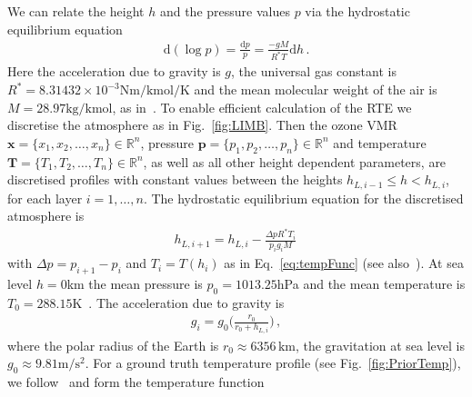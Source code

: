 We can relate the height $h$ and the pressure values $p$ via the hydrostatic equilibrium equation
\begin{align}
	\text{d}(\log p) = \frac{\text{d}p}{p} = \frac{- g M}{R^* T} \text{d} h \, .\label{eq:hydr}
\end{align}
Here the acceleration due to gravity is $g$, the universal gas constant is $R^* = 8.31432 \times 10^{-3} \text{Nm} / \text{kmol} / \text{K}$ and the mean molecular weight of the air is $M = 28.97 \text{kg/kmol}$, as in~\cite{atmosphere1976us}.
To enable efficient calculation of the RTE we discretise the atmosphere as in Fig.~\ref{fig:LIMB}.
Then the ozone VMR $\bm{x} =\{x_1,x_2,\ldots,x_n\} \in \mathbb{R}^{n}$, pressure $\bm{p} =\{p_1,p_2,\ldots,p_n\} \in \mathbb{R}^{n}$ and temperature $\bm{T} =\{T_1,T_2,\ldots,T_n\} \in \mathbb{R}^{n}$, as well as all other height dependent parameters, are discretised profiles with constant values between the heights $h_{L,i-1} \leq h < h_{L,i}$, for each layer $i = 1,\dots, n$.
The hydrostatic equilibrium equation for the discretised atmosphere is
\begin{align}
	h_{L,i+1} =  h_{L,i} - \frac{\Delta p R^* T_i  }{p_i  g_i M} \, 
\end{align}
with $\Delta p = p_{i+1} - p_{i}$ and $T_i = T(h_i)$ as in Eq.~\ref{eq:tempFunc} (see also~\cite{Carlotti99,Ridolfi00}).
At sea level $h = 0$km the mean pressure is $p_0 = 1013.25$hPa and the mean temperature is $T_0 = 288.15$K~\cite{atmosphere1976us}.
The acceleration due to gravity is
\begin{align}
	g_i = g_0 \Bigg( \frac{r_0}{r_0 + h_{L,i}} \Bigg) \, ,
\end{align}
where the polar radius of the Earth is $r_0 \approx 6356 \, \text{km}$, the gravitation at sea level is $g_0 \approx 9.81 \text{m}/\text{s}^2$.
For a ground truth temperature profile (see Fig.~\ref{fig:PriorTemp}), we follow~\cite{atmosphere1976us} and form the temperature function
